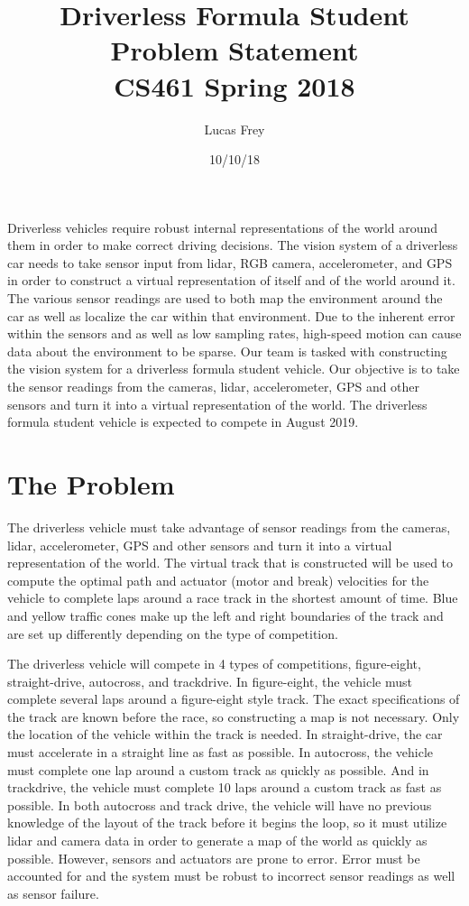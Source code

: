 \documentclass[10pt]{article}
\title{
Driverless Formula Student Problem Statement \\
CS461 Spring 2018
}
\author{Lucas Frey}
\date{10/10/18}
\begin{document}
\maketitle

Driverless vehicles require robust internal representations of the world around them in order to make correct driving decisions. The vision system of a driverless car needs to take sensor input from lidar, RGB camera, accelerometer, and GPS in order to construct a virtual representation of itself and of the world around it. The various sensor readings are used to both map the environment around the car as well as localize the car within that environment. Due to the inherent error within the sensors and as well as low sampling rates, high-speed motion can cause data about the environment to be sparse. Our team is tasked with constructing the vision system for a driverless formula student vehicle. Our objective is to take the sensor readings from the cameras, lidar, accelerometer, GPS and other sensors and turn it into a virtual representation of the world. The driverless formula student vehicle is expected to compete in August 2019. 

\newpage
\section{The Problem} 

The driverless vehicle must take advantage of sensor readings from the cameras, lidar, accelerometer, GPS and other sensors and turn it into a virtual representation of the world. The virtual track that is constructed will be used to compute the optimal path and actuator (motor and break) velocities for the vehicle to complete laps around a race track in the shortest amount of time. Blue and yellow traffic cones make up the left and right boundaries of the track and are set up differently depending on the type of competition. \par

The driverless vehicle will compete in 4 types of competitions, figure-eight, straight-drive, autocross, and trackdrive. In figure-eight, the vehicle must complete several laps around a figure-eight style track. The exact specifications of the track are known before the race, so constructing a map is not necessary. Only the location of the vehicle within the track is needed. In straight-drive, the car must accelerate in a straight line as fast as possible. In autocross, the vehicle must complete one lap around a custom track as quickly as possible. And in trackdrive, the vehicle must complete 10 laps around a custom track as fast as possible. In both autocross and track drive, the vehicle will have no previous knowledge of the layout of the track before it begins the loop, so it must utilize lidar and camera data in order to generate a map of the world as quickly as possible. However, sensors and actuators are prone to error. Error must be accounted for and the system must be robust to incorrect sensor readings as well as sensor failure.
\end{document}
